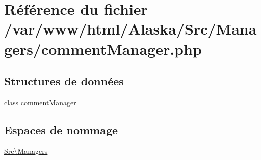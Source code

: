 \hypertarget{comment_manager_8php}{}\section{Référence du fichier /var/www/html/\+Alaska/\+Src/\+Managers/comment\+Manager.php}
\label{comment_manager_8php}
\subsection*{Structures de données}
\begin{DoxyCompactItemize}
\item 
class \hyperlink{class_src_1_1_managers_1_1comment_manager}{comment\+Manager}
\end{DoxyCompactItemize}
\subsection*{Espaces de nommage}
\begin{DoxyCompactItemize}
\item 
 \hyperlink{namespace_src_1_1_managers}{Src\textbackslash{}\+Managers}
\end{DoxyCompactItemize}
